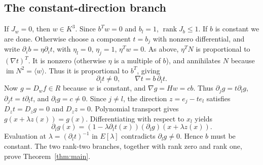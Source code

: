 \documentclass[11pt,a4paper]{article}
\newcommand{\rank}{\operatorname{rank}}
\newcommand{\im}{\operatorname{im}}
\begin{document}
\subsection{The constant-direction branch}
If $J_w=0$, then $w\in K^3$. Since $b^Tw=0$ and $b_l=1$, $\rank J_b\le1$. If $b$ is constant we are done. Otherwise choose a component $t=b_j$ with nonzero differential, and write $\partial_i b=\eta\partial_i t$, with $\eta_l=0$, $\eta_j=1$, $\eta^Tw=0$. As above, $\eta^TN$ is proportional to $(\nabla t)^T$. It is nonzero (otherwise $\eta$ is a multiple of $b$), and annihilates $N$ because $\im N^2=\langle w\rangle$. Thus it is proportional to $b^T$, giving
\[
 \partial_l t\ne0,\qquad \nabla t=b\,\partial_lt.
\]
Now $g=D_wf\in R$ because $w$ is constant, and $\nabla g=Hw=cb$. Thus $\partial_jg=t\partial_lg$, $\partial_jt=t\partial_lt$, and $\partial_lg=c\ne0$. Since $j\ne l$, the direction $z=e_j-te_l$ satisfies $D_zt=D_zg=0$ and $D_zz=0$. Polynomial transport gives $g(x+\lambda z(x))=g(x)$. Differentiating with respect to $x_l$ yields
\[
 \partial_lg(x)=(1-\lambda\partial_lt(x))(\partial_lg)(x+\lambda z(x)).
\]
Evaluation at $\lambda=(\partial_lt)^{-1}$ in $E[\lambda]$ contradicts $\partial_lg\ne0$. Hence $b$ must be constant. The two rank-two branches, together with rank zero and rank one, prove Theorem~\ref{thm:main}.
\end{document}
